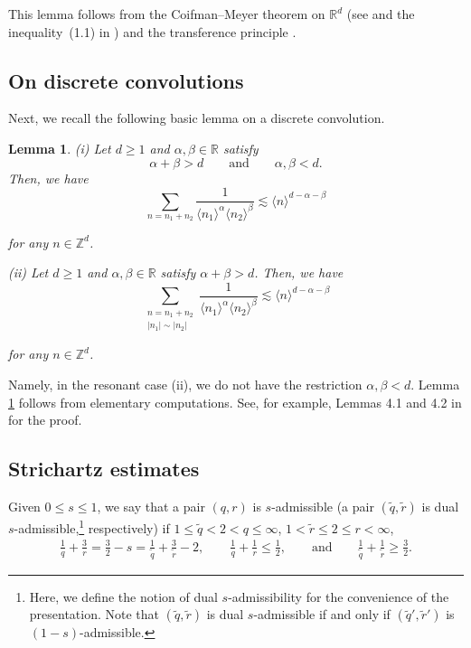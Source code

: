 \documentclass[%
11pt,  reqno]{amsart}
\newtheorem{lemma}[theorem]{Lemma}
\newcommand{\1}{\hspace{0.2mm}\text{I}\hspace{0.2mm}}
\newcommand{\noi}{\noindent}
\newcommand{\Z}{\mathbb{Z}}
\newcommand{\R}{\mathbb{R}}
\newcommand{\al}{\alpha}
\newcommand{\be}{\beta}
\newcommand{\wt}{\widetilde}
\newcommand{\les}{\lesssim}
\newcommand{\jb}[1]
{\langle #1 \rangle}
\numberwithin{equation}{section}
\numberwithin{theorem}{section}
\begin{document}
This lemma follows from 
 the Coifman--Meyer theorem on $\R^d$  (see \cite{CM} and the inequality~(1.1) in \cite{MS})
 and   the transference principle \cite[Theorem 3]{FS}.
 



\subsection{On discrete convolutions}


Next, we recall the following basic lemma on a discrete convolution.


\begin{lemma}\label{LEM:SUM}
\textup{(i)}
Let $d \geq 1$ and $\al, \be \in \R$ satisfy
\[ \al+ \be > d  \qquad \text{and}\qquad \al, \be < d.\]
\noi
Then, we have
\[
 \sum_{n = n_1 + n_2} \frac{1}{\jb{n_1}^\al \jb{n_2}^\be}
\les \jb{n}^{d - \al - \be}\]

\noi
for any $n \in \Z^d$.

\smallskip

\noi
\textup{(ii)}
Let $d \geq 1$ and $\al, \be \in \R$ satisfy $\al+ \be > d$.
\noi
Then, we have
\[
 \sum_{\substack{n = n_1 + n_2\\|n_1|\sim|n_2|}} \frac{1}{\jb{n_1}^\al \jb{n_2}^\be}
\les \jb{n}^{d - \al - \be}\]

\noi
for any $n \in \Z^d$.



\end{lemma}


Namely, in the resonant case (ii), we do not have the restriction $\al, \be < d$.
Lemma \ref{LEM:SUM} follows
from elementary  computations.
See, for example,  Lemmas 4.1 and 4.2 in \cite{MWX} for the proof.



\subsection{Strichartz estimates}
Given  $0 \leq s \leq 1$, 
we say that a pair $(q, r)$ is $s$-admissible 
(a pair $(\wt q, \wt r)$ is dual $s$-admissible,\footnote{Here, we define
the notion of dual $s$-admissibility for the convenience of the presentation.
Note that $(\wt q, \wt r)$ is dual $s$-admissible
if and only if $(\wt q', \wt r')$ is $(1-s)$-admissible.}
 respectively)
if $1 \leq \wt q < 2 < q \leq \infty$, 
 $1< \wt r \le 2 \leq r <\infty$, 
\begin{align*}
 \frac{1}{q} + \frac 3r  = \frac{3}{2}-  s =  \frac1{\wt q}+ \frac3{\wt r} -2, 
\qquad
\frac 1q + \frac{1}{r} \leq \frac 1 2, 
\qquad \text{and} 
\qquad  
\frac1{\wt q}+\frac1{\wt r} \geq \frac32   .
\end{align*}
\end{document}

